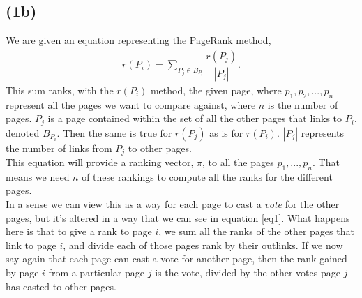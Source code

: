 \documentclass[12pt, letterpaper]{article}
\begin{document}
    \subsection*{(1b)}
      We are given an equation representing the PageRank method,
      \begin{align} \label{eq1}
        r(P_i) = \sum\limits_{P_j \in B_{P_i}} \dfrac{r(P_j)}{|P_j|}.
      \end{align}
      This sum ranks, with the $r(P_i)$ method, the given page, where $p_1, p_2, ... , p_n$ represent all the pages we want to compare against, where $n$ is the number of pages. $P_j$ is a page contained within the set of all the other pages that links to $P_i$, denoted $B_{P_i}$. Then the same is true for $r(P_j)$ as is for $r(P_i)$. $|P_j|$ represents the number of links from $P_j$ to other pages.\\
      \newline
      This equation will provide a ranking vector, $\pi$, to all the pages $p_1,...,p_n$. That means we need $n$ of these rankings to compute all the ranks for the different pages.\\
      In a sense we can view this as a way for each page to cast a \textit{vote} for the other pages, but it's altered in a way that we can see in equation \ref{eq1}. What happens here is that to give a rank to page $i$, we sum all the ranks of the other pages that link to page $i$, and divide each of those pages rank by their outlinks. If we now say again that each page can cast a vote for another page, then the rank gained by page $i$ from a particular page $j$ is the vote, divided by the other votes page $j$ has casted to other pages.
\end{document}
